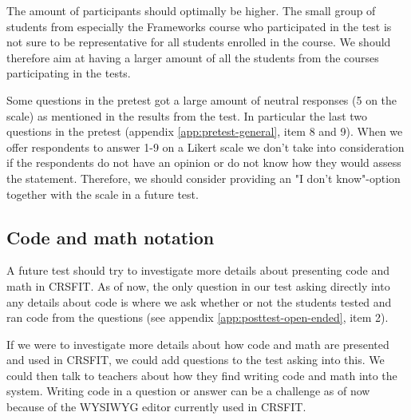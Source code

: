 The amount of participants should optimally be higher. The small group of students from especially the Frameworks course who participated in the test is not sure to be representative for all students enrolled in the course. We should therefore aim at having a larger amount of all the students from the courses participating in the tests.

Some questions in the pretest got a large amount of neutral responses (5 on the scale) as mentioned in the results from the test. In particular the last two questions in the pretest (appendix \ref{app:pretest-general}, item 8 and 9). When we offer respondents to answer 1-9 on a Likert scale we don't take into consideration if the respondents do not have an opinion or do not know how they would assess the statement. Therefore, we should consider providing an "I don't know"-option together with the scale in a future test.


\subsection{Code and math notation}
A future test should try to investigate more details about presenting code and math in CRSFIT. As of now, the only question in our test asking directly into any details about code is where we ask whether or not the students tested and ran code from the questions (see appendix \ref{app:posttest-open-ended}, item 2). 






If we were to investigate more details about how code and math are presented and used in CRSFIT, we could add questions to the test asking into this. We could then talk to teachers about how they find writing code and math into the system. Writing code in a question or answer can be a challenge as of now because of the WYSIWYG editor currently used in CRSFIT. 

